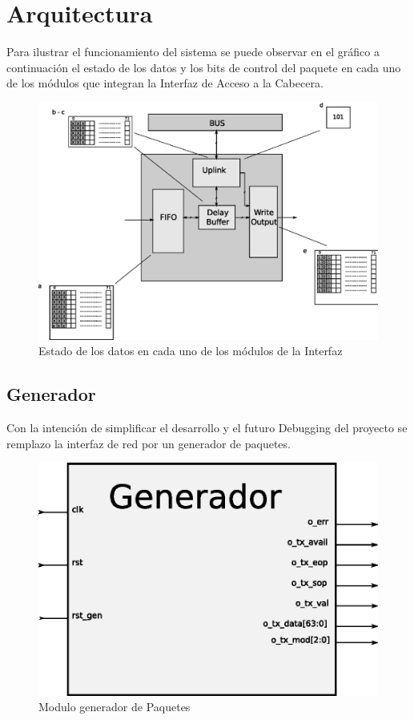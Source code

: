 \chapter{Arquitectura}

Para ilustrar el funcionamiento del sistema se puede observar en el gráfico a continuación el estado de los datos y los bits de control del paquete en cada uno de los módulos que integran la Interfaz de Acceso a la Cabecera.

\begin{figure}[H]
  \centering
	\includegraphics[scale=0.60]{3-arquitectura/graf/moduloexp.eps}
  \caption{Estado de los datos en cada uno de los módulos de la Interfaz}
  \label{fig:interfaz1}
\end{figure}

\section{Generador}

Con la intención de simplificar el desarrollo y el futuro Debugging del proyecto se remplazo la interfaz de red por un generador de paquetes.

\begin{figure}[H]
  \centering
	\includegraphics[scale=0.60]{3-arquitectura/graf/bloqgenerador.eps}
  \caption{Modulo generador de Paquetes}
  \label{fig:gen}
\end{figure}


